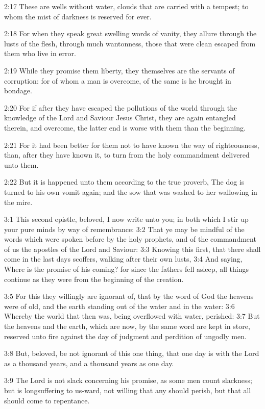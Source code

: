2:17 These are wells without water, clouds that are carried with a tempest; to whom the mist of darkness is reserved for ever.

2:18 For when they speak great swelling words of vanity, they allure through the lusts of the flesh, through much wantonness, those that were clean escaped from them who live in error.

2:19 While they promise them liberty, they themselves are the servants of corruption: for of whom a man is overcome, of the same is he brought in bondage.

2:20 For if after they have escaped the pollutions of the world through the knowledge of the Lord and Saviour Jesus Christ, they are again entangled therein, and overcome, the latter end is worse with them than the beginning.

2:21 For it had been better for them not to have known the way of righteousness, than, after they have known it, to turn from the holy commandment delivered unto them.

2:22 But it is happened unto them according to the true proverb, The dog is turned to his own vomit again; and the sow that was washed to her wallowing in the mire.

3:1 This second epistle, beloved, I now write unto you; in both which I stir up your pure minds by way of remembrance: 3:2 That ye may be mindful of the words which were spoken before by the holy prophets, and of the commandment of us the apostles of the Lord and Saviour: 3:3 Knowing this first, that there shall come in the last days scoffers, walking after their own lusts, 3:4 And saying, Where is the promise of his coming? for since the fathers fell asleep, all things continue as they were from the beginning of the creation.

3:5 For this they willingly are ignorant of, that by the word of God the heavens were of old, and the earth standing out of the water and in the water: 3:6 Whereby the world that then was, being overflowed with water, perished: 3:7 But the heavens and the earth, which are now, by the same word are kept in store, reserved unto fire against the day of judgment and perdition of ungodly men.

3:8 But, beloved, be not ignorant of this one thing, that one day is with the Lord as a thousand years, and a thousand years as one day.

3:9 The Lord is not slack concerning his promise, as some men count slackness; but is longsuffering to us-ward, not willing that any should perish, but that all should come to repentance.

